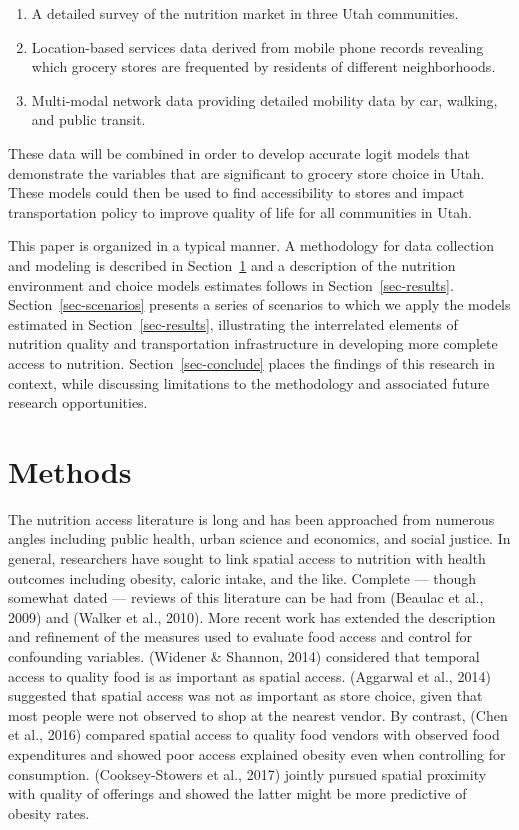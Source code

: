 \documentclass[
  letterpaper,
  number,
  review,
  3p]{elsarticle}
\providecommand{\tightlist}{%
  \setlength{\itemsep}{0pt}\setlength{\parskip}{0pt}}\usepackage{longtable,booktabs,array}
\begin{document}
\begin{enumerate}
\def\labelenumi{\arabic{enumi}.}
\tightlist
\item
  A detailed survey of the nutrition market in three Utah communities.
\item
  Location-based services data derived from mobile phone records
  revealing which grocery stores are frequented by residents of
  different neighborhoods.
\item
  Multi-modal network data providing detailed mobility data by car,
  walking, and public transit.
\end{enumerate}

These data will be combined in order to develop accurate logit models
that demonstrate the variables that are significant to grocery store
choice in Utah. These models could then be used to find accessibility to
stores and impact transportation policy to improve quality of life for
all communities in Utah.

This paper is organized in a typical manner. A methodology for data
collection and modeling is described in Section~\ref{sec-methods} and a
description of the nutrition environment and choice models estimates
follows in Section~\ref{sec-results}. Section~\ref{sec-scenarios}
presents a series of scenarios to which we apply the models estimated in
Section~\ref{sec-results}, illustrating the interrelated elements of
nutrition quality and transportation infrastructure in developing more
complete access to nutrition. Section~\ref{sec-conclude} places the
findings of this research in context, while discussing limitations to
the methodology and associated future research opportunities.


\section{Methods}\label{sec-methods}

The nutrition access literature is long and has been approached from
numerous angles including public health, urban science and economics,
and social justice. In general, researchers have sought to link spatial
access to nutrition with health outcomes including obesity, caloric
intake, and the like. Complete --- though somewhat dated --- reviews of
this literature can be had from (Beaulac et al., 2009) and (Walker et
al., 2010). More recent work has extended the description and refinement
of the measures used to evaluate food access and control for confounding
variables. (Widener \& Shannon, 2014) considered that temporal access to
quality food is as important as spatial access. (Aggarwal et al., 2014)
suggested that spatial access was not as important as store choice,
given that most people were not observed to shop at the nearest vendor.
By contrast, (Chen et al., 2016) compared spatial access to quality food
vendors with observed food expenditures and showed poor access explained
obesity even when controlling for consumption. (Cooksey-Stowers et al.,
2017) jointly pursued spatial proximity with quality of offerings and
showed the latter might be more predictive of obesity rates.
\end{document}
